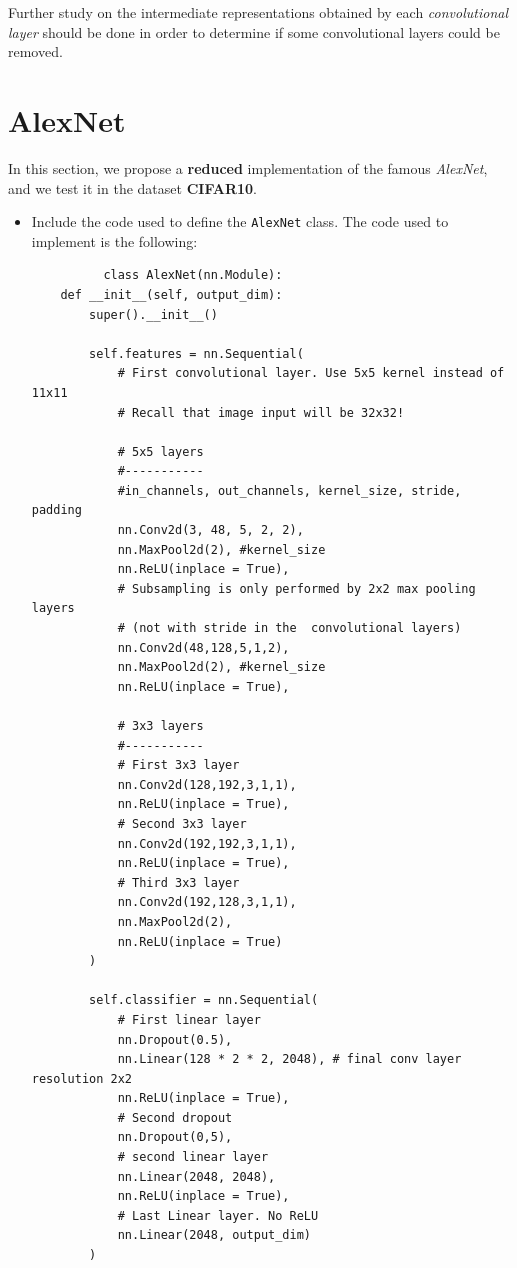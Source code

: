 \documentclass[a4paper]{article}
\def\inline{\lstinline[basicstyle=\ttfamily,keywordstyle={}]}
\begin{document}
\begin{itemize}
        Further study on the intermediate representations obtained by each \emph{convolutional layer} should be done in order to determine if some convolutional layers could be removed.
\end{itemize}

\newpage

\section{AlexNet}

In this section, we propose a \textbf{reduced} implementation of the famous \emph{AlexNet}, and we test it in the dataset \textbf{CIFAR10}.

\begin{itemize}
  \item Include the code used to define the \inline{AlexNet} class.
        The code used to implement is the following:
        \begin{verbatim}
          class AlexNet(nn.Module):
    def __init__(self, output_dim):
        super().__init__()
        
        self.features = nn.Sequential(
            # First convolutional layer. Use 5x5 kernel instead of 11x11
            # Recall that image input will be 32x32!

            # 5x5 layers
            #-----------
            #in_channels, out_channels, kernel_size, stride, padding
            nn.Conv2d(3, 48, 5, 2, 2), 
            nn.MaxPool2d(2), #kernel_size
            nn.ReLU(inplace = True),
            # Subsampling is only performed by 2x2 max pooling layers 
            # (not with stride in the  convolutional layers)
            nn.Conv2d(48,128,5,1,2),
            nn.MaxPool2d(2), #kernel_size
            nn.ReLU(inplace = True),

            # 3x3 layers
            #-----------
            # First 3x3 layer
            nn.Conv2d(128,192,3,1,1),
            nn.ReLU(inplace = True),
            # Second 3x3 layer
            nn.Conv2d(192,192,3,1,1),
            nn.ReLU(inplace = True),
            # Third 3x3 layer
            nn.Conv2d(192,128,3,1,1),
            nn.MaxPool2d(2),
            nn.ReLU(inplace = True)
        )
        
        self.classifier = nn.Sequential(
            # First linear layer
            nn.Dropout(0.5),
            nn.Linear(128 * 2 * 2, 2048), # final conv layer resolution 2x2
            nn.ReLU(inplace = True),
            # Second dropout
            nn.Dropout(0,5),
            # second linear layer
            nn.Linear(2048, 2048),
            nn.ReLU(inplace = True),
            # Last Linear layer. No ReLU
            nn.Linear(2048, output_dim)
        )


\end{verbatim}
\end{itemize}
\end{document}

